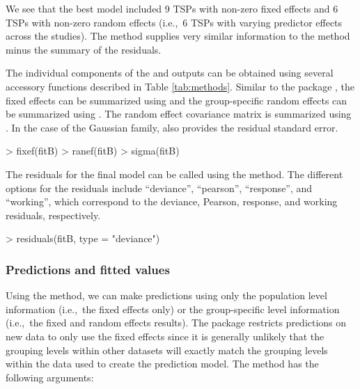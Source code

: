 
We see that the best model included 9 TSPs with non-zero fixed effects and 6 TSPs with non-zero random effects (i.e.,~6 TSPs with varying predictor effects across the studies). The  method supplies very similar information to the  method minus the summary of the residuals.

The individual components of the  and  outputs can be obtained using several accessory functions described in Table \ref{tab:methods}. Similar to the package , the fixed effects can be summarized using  and the group-specific random effects can be summarized using . The random effect covariance matrix is summarized using . In the case of the
Gaussian family,  also provides the residual standard error.


\begin{example}
> fixef(fitB)
> ranef(fitB)
> sigma(fitB)
\end{example}


The residuals for the final model can be called using the  method. The different  options for the residuals include
``deviance'', ``pearson'', ``response'', and ``working'', which
correspond to the deviance, Pearson, response, and working residuals, respectively.

\begin{example}
> residuals(fitB, type = "deviance")
\end{example}


\subsubsection{Predictions and fitted
values}
\label{sec:predictions-fitted}

Using the  method, we can make predictions using only
the population level information (i.e.,~the fixed effects only) or the
group-specific level information (i.e.,~the fixed and random effects
results). The 
package restricts predictions on new data to only use the fixed effects since it is generally unlikely that the grouping levels within other datasets will exactly match the grouping levels within the data used to create the prediction model.
The  method has the following arguments:

